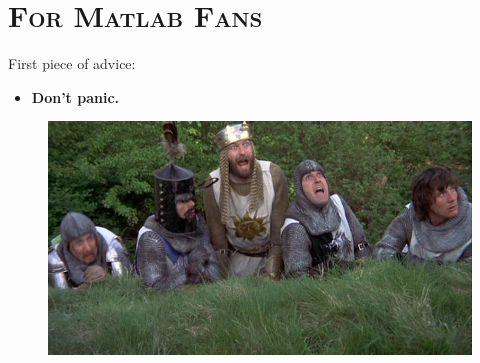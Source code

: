 \documentclass[xcolor=x11names, compress]{beamer}
\renewcommand{\(}{\begin{columns}}
\renewcommand{\)}{\end{columns}}
\newcommand{\<}[1]{\begin{column}{#1}}
\renewcommand{\>}{\end{column}}
\begin{document}
  
\section{ \scshape For Matlab Fans}
\begin{frame}{}
\large
\vspace{30pt}


First piece of advice:

\pause
\vspace{10pt}

\begin{itemize}
  \item \textbf{\Large Don't panic.}
\end{itemize}

\vspace{20pt}

\begin{figure}[b]
  \centering
  \includegraphics[width=\textwidth, clip, trim= 0 100 0 0]{HolyGrail072}
\end{figure}

\end{frame}
\end{document}
